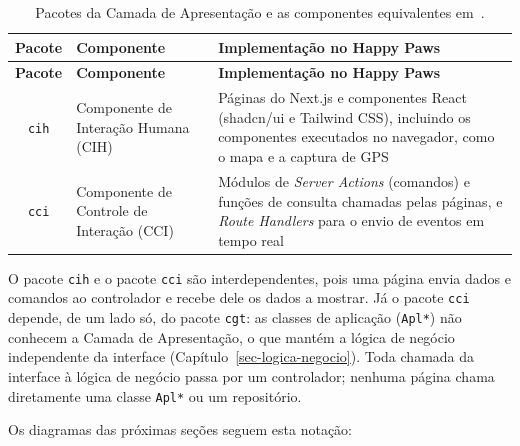\begin{footnotesize}
\setlength{\tabcolsep}{4pt}
\begin{longtable}{|c|p{4.8cm}|p{6.2cm}|}
	\caption{Pacotes da Camada de Apresentação e as componentes equivalentes em~\cite{falbo:notas18}.}
	\label{tabela-pacotes-ciu}\\\hline
	\rowcolor{lightgray}
	\textbf{Pacote} & \textbf{Componente} & \textbf{Implementação no Happy Paws} \\\hline
	\endfirsthead
	\hline
	\rowcolor{lightgray}
	\textbf{Pacote} & \textbf{Componente} & \textbf{Implementação no Happy Paws} \\\hline
	\endhead
	\texttt{cih} & Componente de Interação Humana (CIH) & Páginas do Next.js e componentes React (shadcn/ui e Tailwind CSS), incluindo os componentes executados no navegador, como o mapa e a captura de GPS \\\hline
	\texttt{cci} & Componente de Controle de Interação (CCI) & Módulos de \textit{Server Actions} (comandos) e funções de consulta chamadas pelas páginas, e \textit{Route Handlers} para o envio de eventos em tempo real \\\hline
\end{longtable}
\end{footnotesize}

O pacote \texttt{cih} e o pacote \texttt{cci} são interdependentes, pois uma página envia dados e comandos ao controlador e recebe dele os dados a mostrar. Já o pacote \texttt{cci} depende, de um lado só, do pacote \texttt{cgt}: as classes de aplicação (\texttt{Apl*}) não conhecem a Camada de Apresentação, o que mantém a lógica de negócio independente da interface (Capítulo~\ref{sec-logica-negocio}). Toda chamada da interface à lógica de negócio passa por um controlador; nenhuma página chama diretamente uma classe \texttt{Apl*} ou um repositório.

Os diagramas das próximas seções seguem esta notação:

